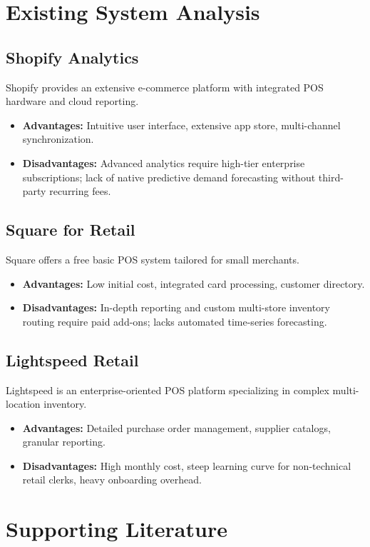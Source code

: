 \documentclass[12pt,a4paper]{report}
\begin{document}
\section{Existing System Analysis}

\subsection{Shopify Analytics}
Shopify provides an extensive e-commerce platform with integrated POS hardware and cloud reporting.
\begin{itemize}
    \item \textbf{Advantages:} Intuitive user interface, extensive app store, multi-channel synchronization.
    \item \textbf{Disadvantages:} Advanced analytics require high-tier enterprise subscriptions; lack of native predictive demand forecasting without third-party recurring fees.
\end{itemize}

\subsection{Square for Retail}
Square offers a free basic POS system tailored for small merchants.
\begin{itemize}
    \item \textbf{Advantages:} Low initial cost, integrated card processing, customer directory.
    \item \textbf{Disadvantages:} In-depth reporting and custom multi-store inventory routing require paid add-ons; lacks automated time-series forecasting.
\end{itemize}

\subsection{Lightspeed Retail}
Lightspeed is an enterprise-oriented POS platform specializing in complex multi-location inventory.
\begin{itemize}
    \item \textbf{Advantages:} Detailed purchase order management, supplier catalogs, granular reporting.
    \item \textbf{Disadvantages:} High monthly cost, steep learning curve for non-technical retail clerks, heavy onboarding overhead.
\end{itemize}

\section{Supporting Literature}
\end{document}

